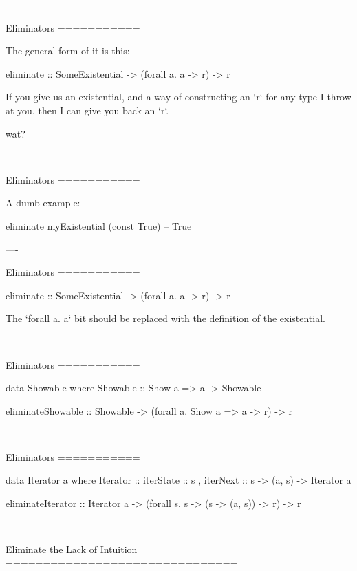 ----

Eliminators
===========

The general form of it is this:

\begin{hs}
  eliminate :: SomeExistential -> (forall a. a -> r) -> r
\end{hs}

If you give us an existential, and a way of constructing an `r` for any type I throw at you, then I can give you back an
`r`.

wat?

----

Eliminators
===========

A dumb example:

\begin{hs}
  eliminate myExistential (const True)   -- True
\end{hs}

----

Eliminators
===========

\begin{hs}
  eliminate :: SomeExistential -> (forall a. a -> r) -> r
\end{hs}

The `forall a. a` bit should be replaced with the definition of the existential.

----

Eliminators
===========

\begin{hs}
  data Showable where
    Showable :: Show a => a -> Showable


  eliminateShowable :: Showable
                    -> (forall a. Show a => a -> r)
                    -> r
\end{hs}

----

Eliminators
===========

\begin{hs}
  data Iterator a where
    Iterator :: { iterState :: s
                , iterNext  :: s -> (a, s)
                } -> Iterator a


  eliminateIterator :: Iterator a
                    -> (forall s. s
                              -> (s -> (a, s))
                              -> r)
                    -> r
\end{hs}

----

Eliminate the Lack of Intuition
===============================

